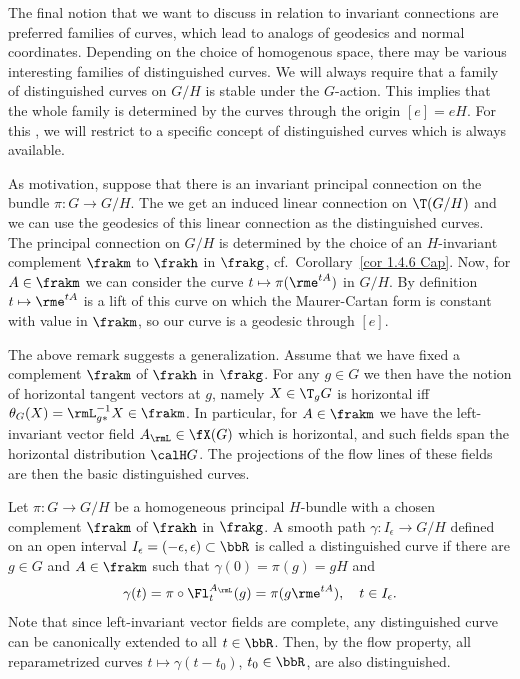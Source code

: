 The final notion that we want to discuss in relation to invariant connections are preferred families of curves, which lead to analogs of geodesics and normal coordinates. Depending on the choice of homogenous space, there may be various interesting families of distinguished curves. We will always require that a family of distinguished curves on $G\slash H$ is stable under the $G$-action. This implies that the whole family is determined by the curves through the origin $[e]=eH$. For this \sect, we will restrict to a specific concept of distinguished curves which is always available.

\begin{rem}\label{rem geodesics of invariant connection}
    As motivation, suppose that there is an invariant principal connection on the bundle $\pi:G\to G\slash H$. The we get an induced linear connection on $\T(G\slash H)$ and we can use the geodesics of this linear connection as the distinguished curves. The principal connection on $G\slash H$ is determined by the choice of an $H$-invariant complement $\frakm$ to $\frakh$ in $\frakg$, cf.\ Corollary~\ref{cor 1.4.6 Cap}. Now, for $A\in\frakm$ we can consider the curve $t\mapsto \pi(\rme^{tA})$ in $G\slash H$. By definition $t\mapsto \rme^{tA}$ is a lift of this curve on which the Maurer-Cartan form is constant with value in $\frakm$, so our curve is a geodesic through $[e]$.
\end{rem}

The above remark suggests a generalization. Assume that we have fixed a complement $\frakm$ of $\frakh$ in $\frakg$. For any $g\in G$ we then have the notion of horizontal tangent vectors at $g$, namely $X\in \T_g G$ is horizontal iff $\theta_G(X)=\rmL_{g\ast}^{-1}X\in\frakm$. In particular, for $A\in\frakm$ we have the left-invariant vector field $A_\rmL\in\fX(G)$ which is horizontal, and such fields span the horizontal distribution $\calH G$. The projections of the flow lines of these fields are then the basic distinguished curves.

\begin{defn}
    Let $\pi:G\to G\slash H$ be a homogeneous principal $H$-bundle with a chosen complement $\frakm$ of $\frakh$ in $\frakg$. A smooth path $\gamma:I_\epsilon\to G\slash H$ defined on an open interval $I_\epsilon=(-\epsilon,\epsilon)\subset \bbR$ is called a distinguished curve if there are $g\in G$ and $A\in\frakm$ such that $\gamma(0)=\pi(g)=gH$ and 
    \[\gamma(t)=\pi\circ \Fl^{A_\rmL}_t(g)=\pi(g\rme^{tA}),\quad t\in I_\epsilon.\]
    Note that since left-invariant vector fields are complete, any distinguished curve can be canonically extended to all $t\in \bbR$. Then, by the flow property, all reparametrized curves $t\mapsto \gamma(t-t_0)$, $t_0\in\bbR$, are also distinguished.
\end{defn}



